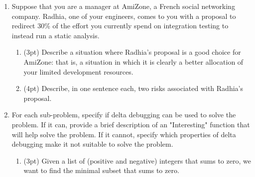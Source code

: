 \documentclass{report}
\newif\ifkey
\newcommand{\answerlong}[1]{\ifkey\color{red}\textbf{#1}\color{black}\else\vspace{0.5in}\fi\xspace}
\newcommand*{\pts}[1]{\addtocounter{points}{#1}(#1pt)}
\begin{document}
\begin{spacing}{1.4}
\begin{enumerate}[leftmargin=*]
\begin{enumerate}
  \end{enumerate}

  \item Suppose that you are a manager at AmiZone, a French social networking company. Radhia, one of your engineers, comes to you
    with a proposal to redirect 30\% of the effort you currently spend on integration testing to instead run a static analysis.
\begin{enumerate}
  \item \pts{3} Describe a situation where Radhia's proposal is a good choice for AmiZone: that is, a situation in which it
    is clearly a better allocation of your limited development resources.
    \\
    \answerlong{Answers can vary. ``AmiZone is concerned about security bugs.'' is the shortest, best answer; short answers that
      identify a class of bugs that static analysis is good at will get full credit..}

  \item \pts{4} Describe, in one sentence each, two risks associated with Radhia's proposal.\\
    \answerlong{Any two of the following sentences would be a good answer (other answers are possible).
      Reducing integration testing may increase the risk that bugs at the boundary between modules are not detected.
      Static analysis may produce too many false positive alarms.
      Static analysis may be unsound or may miss bugs (even of the kind it is supposed to find).
      Static analysis errors may be too hard to understand.
    }
    \end{enumerate}

  \item For each sub-problem, specify if delta debugging can be used
    to solve the problem. If it can, provide a brief description of an "Interesting" function that will help solve the problem. If it
    cannot, specify which properties of delta debugging make it not suitable to solve the problem.
    \begin{enumerate}

    \item \pts{3} Given a list of (positive and negative) integers that sums to zero, we want to find the minimal subset that sums to zero.\\
      \answerlong{Delta debugging is not suitable for this use case: integer summation is ambiguous.}


\end{enumerate}
\end{enumerate}
\end{spacing}
\end{document}

